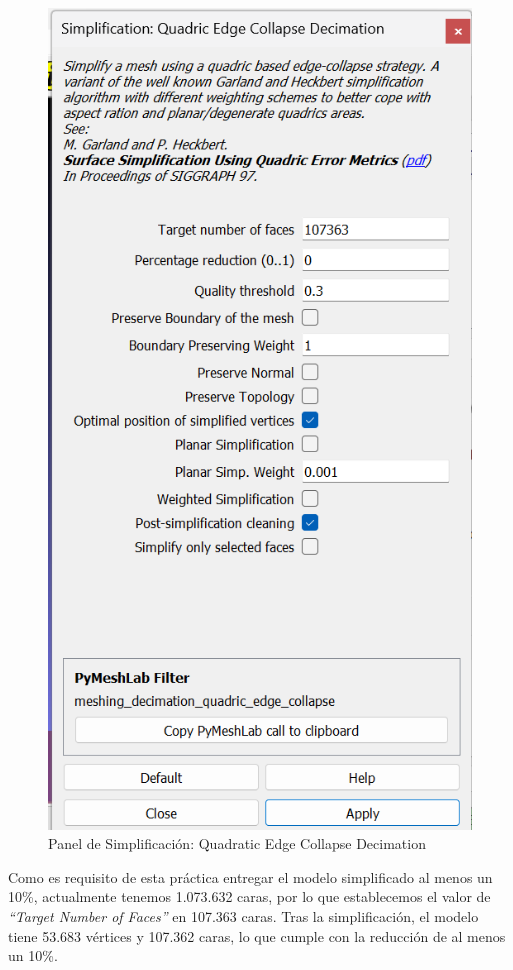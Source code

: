 \documentclass[options]{article}
\begin{document}
\begin{figure}[H]
    \centering
    \includegraphics[scale=0.75]{images/simplificacion_01.png}
    \caption{Panel de Simplificación: Quadratic Edge Collapse Decimation}
\end{figure}

Como es requisito de esta práctica entregar el modelo simplificado al menos un 10\%, actualmente tenemos 1.073.632 caras, por lo que establecemos el valor de \textit{``Target Number of Faces''} en 107.363 caras. Tras la simplificación, el modelo tiene 53.683 vértices y 107.362 caras, lo que cumple con la reducción de al menos un 10\%.
\end{document}
